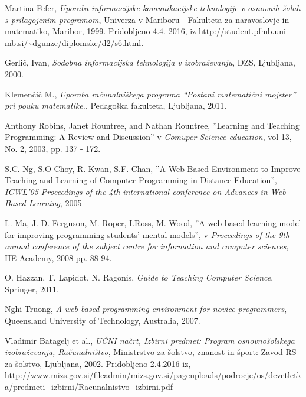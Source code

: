 \begin{thebibliography}{9}

%


  Martina Fefer,
  \emph{Uporaba informacijske-komunikacijske  tehnologije v osnovnih
    šolah s prilagojenim programom},
  Univerza v Mariboru - Fakulteta za naravoslovje in matematiko, Maribor,
  1999. Pridobljeno 4.4. 2016, iz \url{http://student.pfmb.uni-mb.si/~dgunze/diplomske/d2/s6.html}.

  Gerlič, Ivan, \emph{Sodobna informacijska tehnologija v
    izobraževanju}, DZS, Ljubljana, 2000.

  Klemenčič M., \emph{Uporaba računalniškega programa ``Postani
    matematični mojster'' pri pouku matematike.}, Pedagoška fakulteta,
  Ljubljana, 2011.

  Anthony Robins, Janet Rountree, and Nathan Rountree,
  ''Learning and Teaching Programming: A Review and
  Discussion'' v \emph{Comuper Science education}, vol 13, No. 2,
  2003, pp. 137 - 172.

  S.C. Ng, S.O Choy, R. Kwan, S.F. Chan,
  ''A Web-Based Environment to Improve Teaching and Learning of
  Computer Programming in Distance Education'', \emph{ICWL'05
    Proceedings of the 4th international conference on Advances in
    Web-Based Learning}, 2005

  L. Ma, J. D. Ferguson, M. Roper, I.Ross, M. Wood,
  ''A web-based learning model for improving programming students' mental
  models'', v \emph{Proceedings of the 9th annual conference of the subject
  centre for information and computer sciences}, HE Academy, 2008
  pp. 88-94.

  O. Hazzan, T. Lapidot, N. Ragonis,
  \emph{Guide to Teaching Computer Science}, Springer, 2011.

  Nghi Truong,
  \emph{A web-based programming environment for novice programmers},
  Queensland University of Technology, Australia, 2007.

 Vladimir Batagelj et al., \emph{UČNI
    načrt, Izbirni predmet: Program osnovnošolskega izobraževanja,
    Računalništvo}, Ministrstvo za šolstvo, znanost in šport: Zavod RS
  za šolstvo, Ljubljana, 2002. Pridobljeno 2.4.2016 iz,
  \url{http://www.mizs.gov.si/fileadmin/mizs.gov.si/pageuploads/podrocje/os/devetletka/predmeti_izbirni/Racunalnistvo_izbirni.pdf}



\end{thebibliography}
